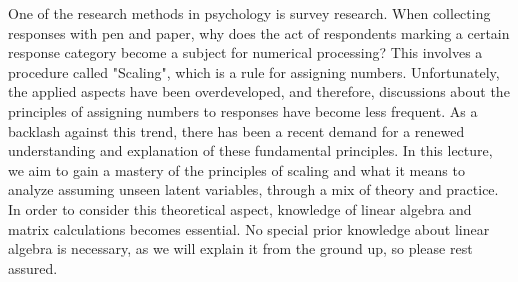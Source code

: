 One of the research methods in psychology is survey research. When collecting responses with pen and paper, why does the act of respondents marking a certain response category become a subject for numerical processing? This involves a procedure called "Scaling", which is a rule for assigning numbers. Unfortunately, the applied aspects have been overdeveloped, and therefore, discussions about the principles of assigning numbers to responses have become less frequent. As a backlash against this trend, there has been a recent demand for a renewed understanding and explanation of these fundamental principles. In this lecture, we aim to gain a mastery of the principles of scaling and what it means to analyze assuming unseen latent variables, through a mix of theory and practice. In order to consider this theoretical aspect, knowledge of linear algebra and matrix calculations becomes essential. No special prior knowledge about linear algebra is necessary, as we will explain it from the ground up, so please rest assured.

